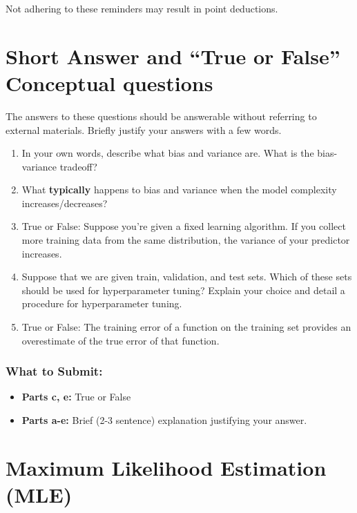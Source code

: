 \documentclass{article}
\begin{document}
Not adhering to these reminders may result in point deductions. \\

\clearpage{}


\section*{Short Answer and ``True or False'' Conceptual questions}
\begin{aprob}
    The answers to these questions should be answerable without referring to external materials.  Briefly justify your answers with a few words.
    \begin{enumerate}
        \item{} In your own words, describe what bias and variance are. What is the bias-variance tradeoff?
        \item {} What \textbf{typically} happens to bias and variance when the model complexity increases/decreases?
        \item {} True or False: Suppose you're given a fixed learning algorithm. If you collect more training data from the same distribution, the variance of your predictor increases.
        \item {} Suppose that we are given train, validation, and test sets. Which of these sets should be used for hyperparameter tuning? Explain your choice and detail a procedure for hyperparameter tuning.
        \item {} True or False: The training error of a function on the training set provides an overestimate of the true error of that function.
    \end{enumerate}
    \subsubsection*{What to Submit:}
    \begin{itemize}
        \item \textbf{Parts c, e:} True or False
        \item \textbf{Parts a-e:} Brief (2-3 sentence) explanation justifying your answer.
    \end{itemize}
\end{aprob}

\section*{Maximum Likelihood Estimation (MLE)}
\end{document}
